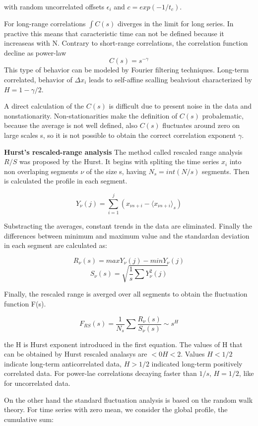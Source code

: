 with random uncorrelated offsets $\epsilon_i$ and $c = exp(-1/t_c)$.

For long-range correlations $\int C(s)$ diverges in the limit for long series. In practive this means that caracteristic time can not be defined because it increaseas with N. Contrary to short-range correlations, the correlation function decline as power-law 
$$C(s) = s^{-\gamma}$$
This type of behavior can be modeled by Fourier filtering techniques. Long-term correlated, behavior of $\Delta x_i$ leads to self-affine scalling beahviout characterized by $H=1-\gamma/2$. 

A direct calculation of the $C(s)$ is difficult due to present noise in the data and nonstationarity. Non-stationarities make the definition of $C(s)$ probalematic, because the average is not well defined, also $C(s)$ fluctuates around zero on large scales s, so it is not possible to obtain the correct correlation exponent $\gamma$. 

\textbf{Hurst's rescaled-range analysis}
The method called rescaled range analysis $R/S$ was proposed by the Hurst. It begins with spliting the time series $x_i$ into non overlaping segments $\nu$ of the size s, having $N_s = int(N/s)$ segments. Then is calculated the profile in each segment. 

$$Y_\nu(j) = \sum_{i=1}^{j} (x_{\nu s +i} - \langle x_{\nu s + i } \rangle _s)$$

Substracting the averages, constant trends in the data are eliminated. Finally the differences between minimum and maximum value and the standardan deviation in each segment are calculated as:

$$R_{\nu}(s) = max Y_\nu(j) - min Y_{\nu}(j)$$
$$S_{\nu}(s) = \sqrt{\frac{1}{s}\sum Y^2_{\nu}(j)}$$

Finally, the rescaled range is averged over all segments to obtain the fluctuation function F(s).

$$F_{RS}(s) = \frac{1}{N_s}\sum \frac{R_{\nu}(s)}{S_{\nu}(s)} \sim s^H$$

the H is Hurst exponent introduced in the first equation. The values of H that can be obtained by Hurst rescaled analasys are $<0H<2$. Values $H<1/2$ indicate long-term anticorrelated data, $H>1/2$ indicated long-term positively correlated data. For power-lae correlations decaying faster than $1/s$, $H=1/2$, like for uncorrelated data. 

On the other hand the standard fluctuation analysis is based on the random walk theory. For time series with zero mean, we consider the global profile, the cumulative sum:

